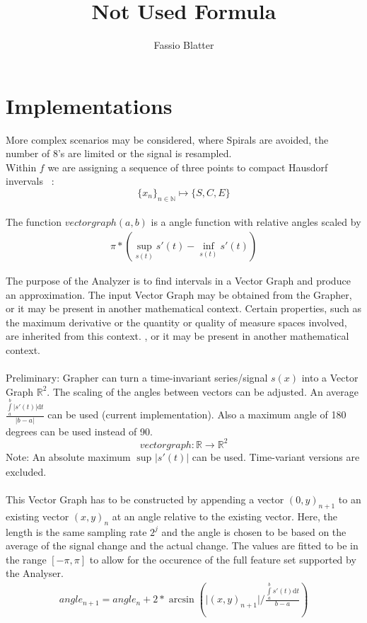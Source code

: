 \documentclass{report}
\begin{document}
\title{Not Used Formula}
\author{Fassio Blatter}
\maketitle

\section{Implementations}
More complex scenarios may be considered, where Spirals are avoided, the number of 8's are limited or the signal is resampled.\\
Within $f$ we are assigning a sequence of three points to compact Hausdorf invervals ~\cite[6.1.3.]{Mortad}:
\begin{equation}
\{x_{n}\}_{n \in \mathbb{N}} \mapsto \{S,C,E\}
\end{equation}\\

The function $vectorgraph(a,b)$ is a angle function with relative angles scaled by
\begin{align}
\pi*(\sup_{s(t)} s'(t)-\inf_{s(t)} s'(t))
\end{align}

The purpose of the Analyzer is to find intervals in a Vector Graph and produce an approximation. The input Vector Graph may be obtained from the Grapher, or it may be present in another mathematical context. Certain properties, such as the maximum derivative or the quantity or quality of measure spaces involved, are inherited from this context.
, or it may be present in another mathematical context.\\\\
Preliminary: Grapher can turn a time-invariant series/signal $s(x)$ into a Vector Graph $\mathbb{R}^2$. The scaling of the angles between vectors can be adjusted. An average $\frac{\int \limits _{a}^{b}\vert s'(t) \vert\mathrm{d}t}{\vert b-a \vert}$ can be used (current implementation). Also a maximum angle of 180 degrees can be used instead of 90.
\begin{equation}
vectorgraph: \mathbb{R} \rightarrow \mathbb{R}^2
\end{equation}
Note: An absolute maximum $\sup_{}\vert s'(t) \vert$ can be used. Time-variant versions are excluded.\\\\

This Vector Graph has to be constructed by appending a vector $(0,y)_{n+1}$ to an existing vector $(x,y)_{n}$ at an angle relative to the existing vector. Here, the length is the same sampling rate $2^j$ and the angle is chosen to be based on the average of the signal change and the actual change. The values are fitted to be in the range $[-\pi,\pi]$ to allow for the occurence of the full feature set supported by the Analyser.
\begin{align}
angle_{n+1}=angle_{n}+2*\arcsin(\vert(x,y)_{n+1}\vert/\frac{\int \limits _{a}^{b} s'(t) \mathrm{d}t}{b-a})
\end{align}
\end{document}
